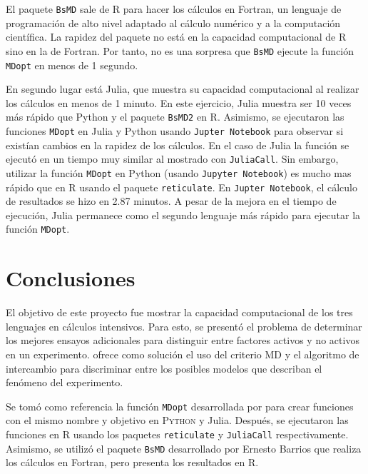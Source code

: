 El paquete \texttt{BsMD} sale de \textsf{R} para hacer los cálculos en \textsf{Fortran}, un lenguaje de programación de alto nivel adaptado al cálculo numérico y a la computación científica. La rapidez del paquete no está en la capacidad computacional de \textsf{R} sino en la de \textsf{Fortran}. Por tanto, no es una sorpresa que \texttt{BsMD} ejecute la función \texttt{MDopt} en menos de 1 segundo. 

En segundo lugar está \textsf{Julia}, que muestra su capacidad computacional al realizar los cálculos en menos de 1 minuto. En este ejercicio, \textsf{Julia} muestra ser 10 veces más rápido que \textsf{Python} y el paquete \texttt{BsMD2} en \textsf{R}. Asimismo, se ejecutaron las funciones \texttt{MDopt} en \textsf{Julia} y \textsf{Python} usando \texttt{Jupter Notebook} para observar si existían cambios en la rapidez de los cálculos. En el caso de \textsf{Julia} la función se ejecutó en un tiempo muy similar al mostrado con \texttt{JuliaCall}. Sin embargo, utilizar la función \texttt{MDopt} en \textsf{Python} (usando \texttt{Jupyter Notebook}) es mucho mas rápido que en \textsf{R} usando el paquete \texttt{reticulate}. En \texttt{Jupter Notebook}, el cálculo de resultados se hizo en 2.87 minutos. A pesar de la mejora en el tiempo de ejecución, \textsf{Julia} permanece como el segundo lenguaje más rápido para ejecutar la función \texttt{MDopt}. 

\section{Conclusiones}

El objetivo de este proyecto fue mostrar la capacidad computacional de los tres lenguajes en cálculos intensivos. Para esto, se presentó el problema de determinar los mejores ensayos adicionales para distinguir entre factores activos y no activos en un experimento. \cite{meyer1996} ofrece como solución el uso del criterio MD y el algoritmo de intercambio para discriminar entre los posibles modelos que describan el fenómeno del experimento. 

Se tomó como referencia la función \texttt{MDopt} desarrollada por \cite{tesis_paty} para crear funciones con el mismo nombre y objetivo en \textsc{Python} y \textsf{Julia}. Después, se ejecutaron las funciones en \textsf{R} usando los paquetes \texttt{reticulate} y \texttt{JuliaCall} respectivamente. Asimismo, se utilizó el paquete \texttt{BsMD} desarrollado por Ernesto Barrios que realiza los cálculos en \textsf{Fortran}, pero presenta los resultados en \textsf{R}. 

